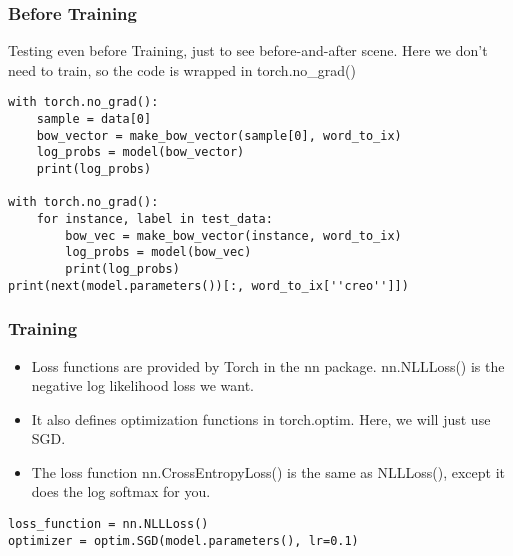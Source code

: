 \begin{frame}[fragile]
\frametitle{Before Training}
Testing even before Training, just to see before-and-after scene. Here we don't need to train, so the code is wrapped in torch.no\_grad()
\begin{lstlisting}
with torch.no_grad():
    sample = data[0]
    bow_vector = make_bow_vector(sample[0], word_to_ix)
    log_probs = model(bow_vector)
    print(log_probs)
    
with torch.no_grad():
    for instance, label in test_data:
        bow_vec = make_bow_vector(instance, word_to_ix)
        log_probs = model(bow_vec)
        print(log_probs)
print(next(model.parameters())[:, word_to_ix[''creo'']])
\end{lstlisting}              
\end{frame} 



\begin{frame}[fragile]
\frametitle{Training}

\begin{itemize}
\item Loss functions are provided by Torch in the nn package. nn.NLLLoss() is the negative log likelihood loss we want. 
\item It also defines optimization functions in torch.optim. Here, we will just use SGD.
\item The loss function nn.CrossEntropyLoss() is the same as NLLLoss(), except it does the log softmax for you.
\end{itemize}
 \begin{lstlisting}
loss_function = nn.NLLLoss()
optimizer = optim.SGD(model.parameters(), lr=0.1)
\end{lstlisting}              
\end{frame} 


